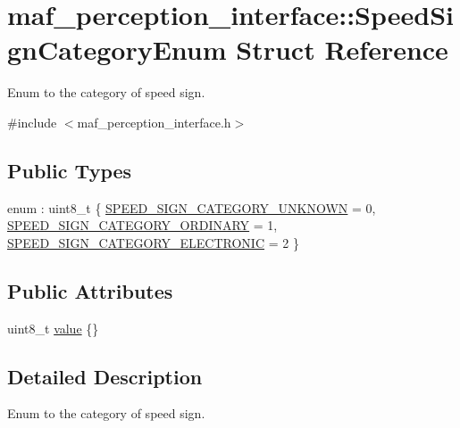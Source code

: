 \hypertarget{structmaf__perception__interface_1_1SpeedSignCategoryEnum}{}\section{maf\+\_\+perception\+\_\+interface\+:\+:Speed\+Sign\+Category\+Enum Struct Reference}
\label{structmaf__perception__interface_1_1SpeedSignCategoryEnum}


Enum to the category of speed sign.  




{\ttfamily \#include $<$maf\+\_\+perception\+\_\+interface.\+h$>$}

\subsection*{Public Types}
\begin{DoxyCompactItemize}
\item 
enum \+: uint8\+\_\+t \{ \hyperlink{structmaf__perception__interface_1_1SpeedSignCategoryEnum_ac295e61091a24477d65b2e18351d03b6af03455e9196a9200d35aae00860f4f3e}{S\+P\+E\+E\+D\+\_\+\+S\+I\+G\+N\+\_\+\+C\+A\+T\+E\+G\+O\+R\+Y\+\_\+\+U\+N\+K\+N\+O\+WN} = 0, 
\hyperlink{structmaf__perception__interface_1_1SpeedSignCategoryEnum_ac295e61091a24477d65b2e18351d03b6a7f2838e2696109acce3da16272b824a4}{S\+P\+E\+E\+D\+\_\+\+S\+I\+G\+N\+\_\+\+C\+A\+T\+E\+G\+O\+R\+Y\+\_\+\+O\+R\+D\+I\+N\+A\+RY} = 1, 
\hyperlink{structmaf__perception__interface_1_1SpeedSignCategoryEnum_ac295e61091a24477d65b2e18351d03b6abfe5b9e407af3b4fabe229b34d66f915}{S\+P\+E\+E\+D\+\_\+\+S\+I\+G\+N\+\_\+\+C\+A\+T\+E\+G\+O\+R\+Y\+\_\+\+E\+L\+E\+C\+T\+R\+O\+N\+IC} = 2
 \}
\end{DoxyCompactItemize}
\subsection*{Public Attributes}
\begin{DoxyCompactItemize}
\item 
uint8\+\_\+t \hyperlink{structmaf__perception__interface_1_1SpeedSignCategoryEnum_a37d97d97350d09153f8ac17564cb6c61}{value} \{\}
\end{DoxyCompactItemize}


\subsection{Detailed Description}
Enum to the category of speed sign. 

